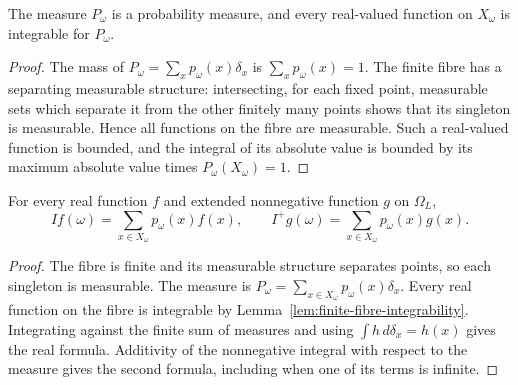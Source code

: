 \begin{lemma}
\label{lem:finite-fibre-integrability}
\leanok
{}
The measure $P_\omega$ is a probability measure, and every real-valued
function on $X_\omega$ is integrable for $P_\omega$.
\end{lemma}
\begin{proof}
The mass of $P_\omega=\sum_x p_\omega(x)\delta_x$ is
$\sum_x p_\omega(x)=1$. The finite fibre has a separating measurable
structure: intersecting, for each fixed point, measurable sets which
separate it from the other finitely many points shows that its singleton
is measurable. Hence all functions on the fibre are measurable. Such
a real-valued function is bounded, and the integral of its absolute
value is bounded by its maximum absolute value times $P_\omega(X_\omega)=1$.
\end{proof}

\begin{lemma}\label{lem:finite-fibre-sums}
\leanok
{}
For every real function $f$ and extended nonnegative function $g$ on
$\Omega_L$,
\[
 If(\omega)=\sum_{x\in X_\omega}p_\omega(x)f(x),\qquad
 I^+g(\omega)=\sum_{x\in X_\omega}p_\omega(x)g(x).
\]
\end{lemma}
\begin{proof}
The fibre is finite and its measurable structure separates points, so
each singleton is measurable. The measure is
$P_\omega=\sum_{x\in X_\omega}p_\omega(x)\delta_x$.
Every real function on the fibre is integrable by
Lemma~\ref{lem:finite-fibre-integrability}.
Integrating against the finite sum of measures and using
$\int h\,d\delta_x=h(x)$ gives the real formula. Additivity of the
nonnegative integral with respect to the measure gives the second
formula, including when one of its terms is infinite.
\end{proof}

